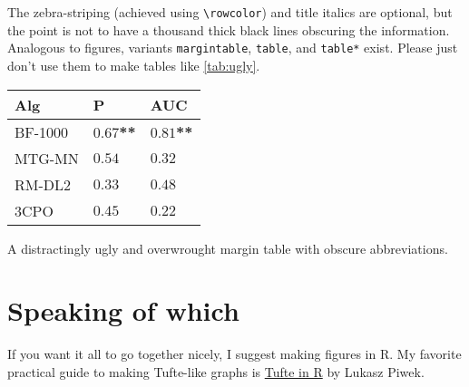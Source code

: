 \vspace{1em}
The zebra-striping (achieved using \verb|\rowcolor|) and title italics are optional, but the point is not to have a thousand thick black lines obscuring the information. Analogous to figures, variants \texttt{margintable}, \texttt{table}, and \texttt{table*} exist. Please just don't use them to make tables like \ref{tab:ugly}.
\begin{margintable}
\centering
\begin{tabular}{|l|l|l|}
\hline
\textbf{Alg}	& \textbf{P}		& \textbf{AUC}		\\ \hline\hline
BF-1000	& \textbf{$\mathbf{0.67}$**}	& \textbf{$\mathbf{0.81}$**}	\\ \hline
MTG-MN	& $0.54$			& $0.32$			\\ \hline
RM-DL2	& $0.33$			& $0.48$			\\ \hline
3CPO	& $0.45$			& $0.22$			\\ \hline
\end{tabular}
\caption{A distractingly ugly and overwrought margin table with obscure abbreviations.}
\label{tab:ugly}
\end{margintable}

\section{Speaking of which}

If you want it all to go together nicely, I suggest making figures in R. My favorite practical guide to making Tufte-like graphs is \href{http://motioninsocial.com/tufte/}{Tufte in R} by Lukasz Piwek.